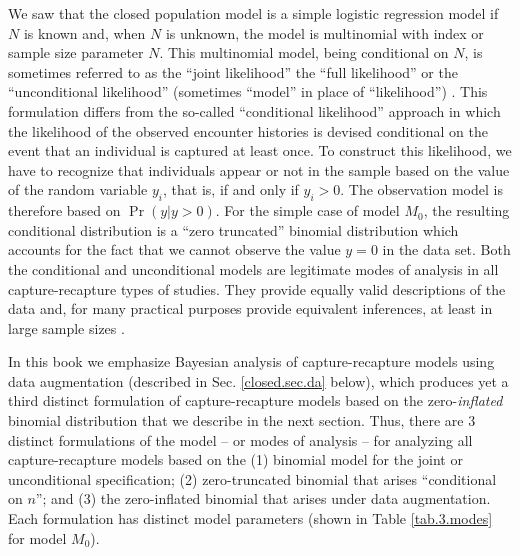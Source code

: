 We saw that the closed population model is a simple logistic
regression model if $N$ is known and, when $N$ is unknown, the model
is multinomial with index or sample size parameter $N$. This
multinomial model, being conditional on $N$, is sometimes referred to
as the ``joint likelihood'' the ``full likelihood'' or the
``unconditional likelihood'' (sometimes
``model'' in place of ``likelihood'')
\citep{sanathanan:1972,borchers_etal:2002}. This
formulation differs from the so-called ``conditional likelihood''
approach in which the likelihood of the observed encounter histories
is devised conditional on the event that an individual is captured at
least once.  To construct this likelihood, we have to recognize that
individuals appear or not in the sample based on the value of the
random variable $y_{i}$, that is, if and only if
$y_{i}>0$.  The observation model is therefore based on $\Pr(y|y>0)$.
For the simple case of model $M_0$, the resulting conditional
distribution is a ``zero truncated'' binomial distribution which
accounts for the fact that we cannot observe the value $y=0$ in the
data set. %
 Both the
conditional and unconditional models are legitimate modes of analysis
in all capture-recapture types of studies. They provide equally
valid descriptions of the data and, for many practical purposes provide
equivalent inferences, at least in large sample sizes
\citep{sanathanan:1972}.

In this book we emphasize Bayesian analysis of capture-recapture
models using data augmentation
(described in Sec. \ref{closed.sec.da} below), which
produces yet a third distinct formulation of capture-recapture models
based on the zero-{\it inflated} binomial distribution that we
describe in the next section.  Thus, there are 3 distinct formulations
of the model -- or modes of analysis -- for analyzing all
capture-recapture models based on the (1) binomial model for the joint
or unconditional specification; (2) zero-truncated binomial that
arises ``conditional on $n$''; and (3) the zero-inflated binomial that
arises under data augmentation.  Each formulation has distinct
model parameters (shown in Table \ref{tab.3.modes} for
model $M_0$).


